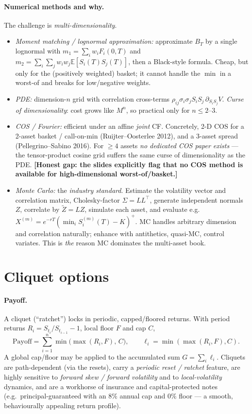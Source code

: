 \documentclass[11pt]{article}
\newcommand{\E}{\mathbb{E}}
\begin{document}
\paragraph{Numerical methods and why.} The challenge is \emph{multi-dimensionality}.
\begin{itemize}[leftmargin=2em]
\item \emph{Moment matching / lognormal approximation:} approximate $B_T$ by a single lognormal with
$m_1=\sum_i w_iF_i(0,T)$ and $m_2=\sum_i\sum_j w_iw_j\E[S_i(T)S_j(T)]$, then a Black-style formula.
Cheap, but only for the (positively weighted) basket; it cannot handle the $\min$ in a worst-of and
breaks for low/negative weights.
\item \emph{PDE:} dimension-$n$ grid with correlation cross-terms
$\rho_{ij}\sigma_i\sigma_j S_iS_j\,\partial_{S_iS_j}V$. \emph{Curse of dimensionality}: cost grows like
$M^n$, so practical only for $n\le 2$--$3$.
\item \emph{COS / Fourier:} efficient under an affine \emph{joint} CF. Concretely, 2-D COS for a
2-asset basket / call-on-min (Ruijter--Oosterlee 2012), and a 3-asset spread (Pellegrino--Sabino
2016). For $\ge 4$ assets \emph{no dedicated COS paper exists} --- the tensor-product cosine grid
suffers the same curse of dimensionality as the PDE. \textbf{[Honest gap: the slides explicitly flag
that no COS method is available for high-dimensional worst-of/basket.]}
\item \emph{Monte Carlo:} the \emph{industry standard}. Estimate the volatility vector and correlation
matrix, Cholesky-factor $\Sigma=LL^\top$, generate independent normals $Z$, correlate by
$\tilde Z=LZ$, simulate each asset, and evaluate e.g.
$X^{(m)}=e^{-rT}(\min_i S_i^{(m)}(T)-K)^+$. MC handles arbitrary dimension and correlation naturally;
enhance with antithetics, quasi-MC, control variates. This is \emph{the} reason MC dominates the
multi-asset book.
\end{itemize}

\section{Cliquet options}

\paragraph{Payoff.} A cliquet (``ratchet'') locks in periodic, capped/floored returns. With period
returns $R_i=S_{t_i}/S_{t_{i-1}}-1$, local floor $F$ and cap $C$,
\[
\text{Payoff}=\sum_{i=1}^n \min\!\big(\max(R_i,F),\,C\big),
\qquad \ell_i=\min(\max(R_i,F),C).
\]
A global cap/floor may be applied to the accumulated sum $G=\sum_i\ell_i$. Cliquets are
path-dependent (via the resets), carry a \emph{periodic reset / ratchet} feature, are highly sensitive
to \emph{forward skew / forward volatility} and to \emph{local-volatility} dynamics, and are a
workhorse of insurance and capital-protected notes (e.g.\ principal-guaranteed with an $8\%$ annual
cap and $0\%$ floor --- a smooth, behaviourally appealing return profile).
\end{document}
